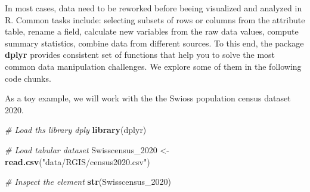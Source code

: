 \documentclass[
]{article}
\newenvironment{Shaded}{\begin{snugshade}}{\end{snugshade}}
\newcommand{\CommentTok}[1]{\textcolor[rgb]{0.56,0.35,0.01}{\textit{#1}}}
\newcommand{\FunctionTok}[1]{\textcolor[rgb]{0.13,0.29,0.53}{\textbf{#1}}}
\newcommand{\NormalTok}[1]{#1}
\newcommand{\OtherTok}[1]{\textcolor[rgb]{0.56,0.35,0.01}{#1}}
\newcommand{\StringTok}[1]{\textcolor[rgb]{0.31,0.60,0.02}{#1}}
\begin{document}
In most cases, data need to be reworked before beeing visualized and analyzed in R. Common tasks include: selecting subsets of rows or columns from the attribute table, rename a field, calculate new variables from the raw data values, compute summary statistics, combine data from different sources. To this end, the package \textbf{dplyr} \citep{Wickham_et_al_2003} provides consistent set of functions that help you to solve the most common data manipulation challenges. We explore some of them in the following code chunks.

As a toy example, we will work with the the Swioss population census dataset 2020.

\begin{Shaded}
\begin{Highlighting}[]
\CommentTok{\# Load ths library dply}
\FunctionTok{library}\NormalTok{(dplyr)}

\CommentTok{\# Load tabular dataset}
\NormalTok{Swisscensus\_2020 }\OtherTok{\textless{}{-}} \FunctionTok{read.csv}\NormalTok{(}\StringTok{"data/RGIS/census2020.csv"}\NormalTok{)}

\CommentTok{\# Inspect the element }
\FunctionTok{str}\NormalTok{(Swisscensus\_2020)}
\end{Highlighting}
\end{Shaded}
\end{document}
